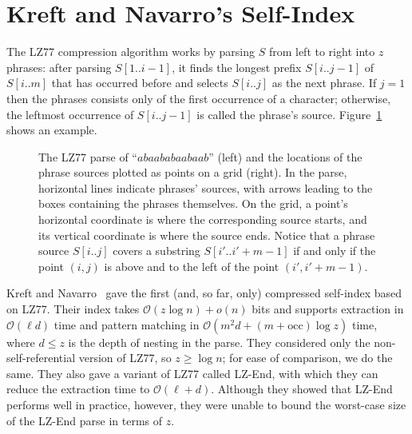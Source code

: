 \documentclass[review]{elsarticle}
\newcommand{\Oh}[1]
    {\ensuremath{\mathcal{O}\!\left( {#1} \right)}}
\newcommand{\occ}
    {\ensuremath{\mathrm{occ}}}
\begin{document}
\section{Kreft and Navarro's Self-Index} \label{sec:KN12}

The LZ77 compression algorithm works by parsing $S$ from left to right into $z$ phrases: after parsing \(S [1..i - 1]\), it finds the longest prefix \(S [i..j - 1]\) of \(S [i..m]\) that has occurred before and selects \(S [i..j]\) as the next phrase.  If \(j = 1\) then the phrases consists only of the first occurrence of a character; otherwise, the leftmost occurrence of \(S [i..j - 1]\) is called the phrase's source.  Figure~\ref{fig:parse} shows an example.

\begin{figure}[t]
\begin{center}
\caption{The LZ77 parse of ``\(abaababaabaab\)'' (left) and the locations of the phrase sources plotted as points on a grid (right).  In the parse, horizontal lines indicate phrases' sources, with arrows leading to the boxes containing the phrases themselves.  On the grid, a point's horizontal coordinate is where the corresponding source starts, and its vertical coordinate is where the source ends.  Notice that a phrase source \(S [i..j]\) covers a substring \(S [i'..i' + m - 1]\) if and only if the point \((i, j)\) is above and to the left of the point \((i', i' + m - 1)\).}
\label{fig:parse}
\end{center}
\end{figure}

Kreft and Navarro~\cite{KN12} gave the first (and, so far, only) compressed self-index based on LZ77.  Their index takes \(\Oh{z \log n} + o (n)\) bits and supports extraction in $\Oh{\ell d}$ time and pattern matching in $\Oh{m^2 d + (m + \occ) \log z}$ time, where \(d \leq z\) is the depth of nesting in the parse.  They considered only the non-self-referential version of LZ77, so \(z \geq \log n\); for ease of comparison, we do the same.  They also gave a variant of LZ77 called LZ-End, with which they can reduce the extraction time to $\Oh{\ell + d}$.  Although they showed that LZ-End performs well in practice, however, they were unable to bound the worst-case size of the LZ-End parse in terms of $z$.
\end{document}
